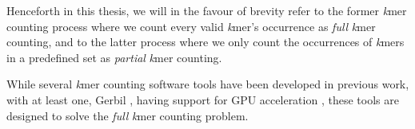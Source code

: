 Henceforth in this thesis, we will in the favour of brevity refer to the former \textit{k}mer counting process where we count every valid \textit{k}mer's occurrence as \textit{full} \textit{k}mer counting, and to the latter process where we only count the occurrences of \textit{k}mers in a predefined set as \textit{partial} \textit{k}mer counting.

While several \textit{k}mer counting software tools have been developed in previous work, with at least one, Gerbil \cite{gerbil}, having support for GPU acceleration \cite{kmer_counting_tools}, these tools are designed to solve the \textit{full} \textit{k}mer counting problem.
